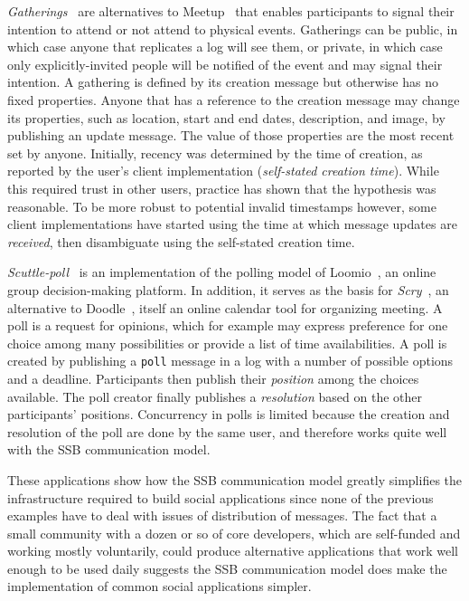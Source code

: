 \documentclass[sigconf]{acmart}
\begin{document}
\textit{Gatherings}~\cite{patch-gatherings} are alternatives to
Meetup~\cite{meetup.com} that enables participants to signal their intention to
attend or not attend to physical events. Gatherings can be public, in which
case anyone that replicates a log will see them, or private, in which case only
explicitly-invited people will be notified of the event and may signal their
intention. A gathering is defined by its creation message but otherwise has no
fixed properties. Anyone that has a reference to the creation message may
change its properties, such as location, start and end dates, description, and
image, by publishing an update message. The value of those properties are the
most recent set by anyone. Initially, recency was determined by the time of
creation, as reported by the user's client implementation (\textit{self-stated
creation time}). While this required trust in other users, practice has shown
that the hypothesis was reasonable. To be more robust to potential invalid
timestamps however, some client implementations have started using the time at
which message updates are \textit{received}, then disambiguate using the
self-stated creation time.

\textit{Scuttle-poll}~\cite{scuttle-poll} is an implementation of the polling
model of Loomio~\cite{loomio}, an online group decision-making platform. In
addition, it serves as the basis for \textit{Scry}~\cite{patchbay-scry}, an
alternative to Doodle~\cite{doodle.com}, itself an online calendar tool for
organizing meeting. A poll is a request for opinions, which for example may
express preference for one choice among many possibilities or provide a list of
time availabilities. A poll is created by publishing a \texttt{poll} message in
a log with a number of possible options and a deadline. Participants then
publish their \textit{position} among the choices available. The poll creator
finally publishes a \textit{resolution} based on the other participants'
positions. Concurrency in polls is limited because the creation and resolution
of the poll are done by the same user, and therefore works quite well with the
SSB communication model.

These applications show how the SSB communication model greatly simplifies the
infrastructure required to build social applications since none of the previous
examples have to deal with issues of distribution of messages. The fact that a
small community with a dozen or so of core developers, which are self-funded
and working mostly voluntarily, could produce alternative applications that
work well enough to be used daily suggests the SSB communication model does
make the implementation of common social applications simpler.
\end{document}
